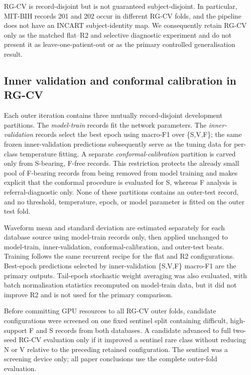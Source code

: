 \documentclass[review,12pt]{elsarticle}
\begin{document}
RG-CV is record-disjoint but is not guaranteed subject-disjoint. In particular,
MIT-BIH records 201 and 202 occur in different RG-CV folds, and the pipeline
does not have an INCART subject-identity map. We consequently retain RG-CV only
as the matched flat--R2 and selective diagnostic experiment and do not present
it as leave-one-patient-out or as the primary controlled generalisation result.

\subsection{Inner validation and conformal calibration in RG-CV}

Each outer iteration contains three mutually record-disjoint development
partitions. The \emph{model-train} records fit the network parameters. The
\emph{inner-validation} records select the best epoch using macro-F1 over
\{S,V,F\}; the same frozen inner-validation predictions subsequently serve as
the tuning data for per-class temperature fitting. A separate
\emph{conformal-calibration} partition is carved only from S-bearing, F-free
records. This restriction protects the already small pool of F-bearing records
from being removed from model training and makes explicit that the conformal
procedure is evaluated for S, whereas F analysis is referral-diagnostic only.
None of these partitions contains an outer-test record, and no threshold,
temperature, epoch, or model parameter is fitted on the outer test fold.

Waveform mean and standard deviation are estimated separately for each database
source using model-train records only, then applied unchanged to model-train,
inner-validation, conformal-calibration, and outer-test beats. Training follows
the same recurrent recipe for the flat and R2 configurations. Best-epoch
predictions selected by inner-validation \{S,V,F\} macro-F1 are the primary
outputs. Tail-epoch stochastic weight averaging was also evaluated, with batch
normalisation statistics recomputed on model-train data, but it did not improve
R2 and is not used for the primary comparison.

Before committing GPU resources to all RG-CV outer folds, candidate configurations
were screened on one fixed sentinel split containing difficult, high-support F
and S records from both databases. A candidate advanced to full two-seed RG-CV
evaluation only if it improved a sentinel rare class without reducing N or V
relative to the preceding retained configuration. The sentinel was a screening
device only; all paper conclusions use the complete outer-fold evaluation.
\end{document}
